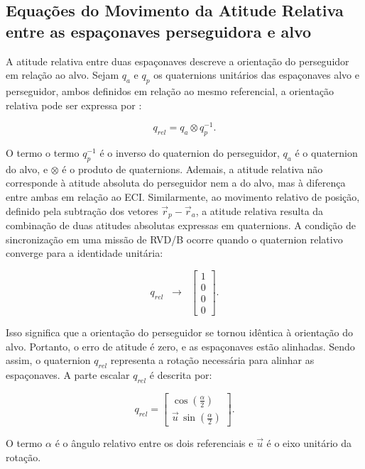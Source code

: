 \subsection{Equações do Movimento da Atitude Relativa entre as espaçonaves perseguidora e alvo}

A atitude relativa entre duas espaçonaves descreve a orientação do perseguidor em relação ao alvo.
Sejam $q_a$ e $q_p$ os quaternions unitários das espaçonaves alvo e perseguidor, ambos definidos em relação ao mesmo referencial, a orientação relativa pode ser expressa por \cite{na2019vision}:

\begin{equation}
q_{rel}
=
q_a \otimes q_p^{-1}.
\label{eq_quat_relativo}
\end{equation}

O termo o termo $q_p^{-1}$ é o inverso do quaternion do perseguidor, $q_a$ é o quaternion do alvo, e $\otimes$ é o produto de quaternions.
Ademais, a atitude relativa não corresponde à atitude absoluta do perseguidor nem a do alvo, mas à diferença entre ambas em relação ao ECI. 
Similarmente, ao movimento relativo de posição, definido pela subtração dos vetores $\vec r_p - \vec r_a$, a atitude relativa resulta da combinação de duas atitudes absolutas expressas em quaternions. 
A condição de sincronização em uma missão de RVD/B ocorre quando o quaternion relativo converge para a identidade unitária:

\begin{equation}
\label{eq_qrel_sincronizacao}
q_{rel} \;\;\longrightarrow\;\; 
\begin{bmatrix}1 \\ 0 \\ 0 \\ 0\end{bmatrix}.
\end{equation}

Isso significa que a orientação do perseguidor se tornou idêntica à orientação do alvo. 
Portanto, o erro de atitude é zero, e as espaçonaves estão alinhadas.
Sendo assim, o quaternion $q_{rel}$ representa a rotação necessária para alinhar as espaçonaves.
A parte escalar $q_{rel}$ é descrita por:

\begin{equation}
q_{rel} =
\begin{bmatrix}
\cos\!\left(\tfrac{\alpha}{2}\right) \\[4pt]
\vec{u}\,\sin\!\left(\tfrac{\alpha}{2}\right)
\end{bmatrix}.
\end{equation}

O termo $\alpha$ é o ângulo relativo entre os dois referenciais e $\vec u$ é o eixo unitário da rotação.
